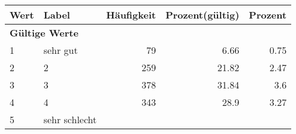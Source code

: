      \begin{longtable}{lXrrr}
     \toprule
     \textbf{Wert} & \textbf{Label} & \textbf{Häufigkeit} & \textbf{Prozent(gültig)} & \textbf{Prozent} \\
     \endhead
     \midrule
     \multicolumn{5}{l}{\textbf{Gültige Werte}}\\

     1 &
     \multicolumn{1}{X}{ sehr gut   } &


       \num{79} &
       \num[round-mode=places,round-precision=2]{6,66} &
         \num[round-mode=places,round-precision=2]{0,75} \\

     2 &
     \multicolumn{1}{X}{ 2   } &


       \num{259} &
       \num[round-mode=places,round-precision=2]{21,82} &
         \num[round-mode=places,round-precision=2]{2,47} \\

     3 &
     \multicolumn{1}{X}{ 3   } &


       \num{378} &
       \num[round-mode=places,round-precision=2]{31,84} &
         \num[round-mode=places,round-precision=2]{3,6} \\

     4 &
     \multicolumn{1}{X}{ 4   } &


       \num{343} &
       \num[round-mode=places,round-precision=2]{28,9} &
         \num[round-mode=places,round-precision=2]{3,27} \\

     5 &
     \multicolumn{1}{X}{ sehr schlecht   } &



\end{longtable}
